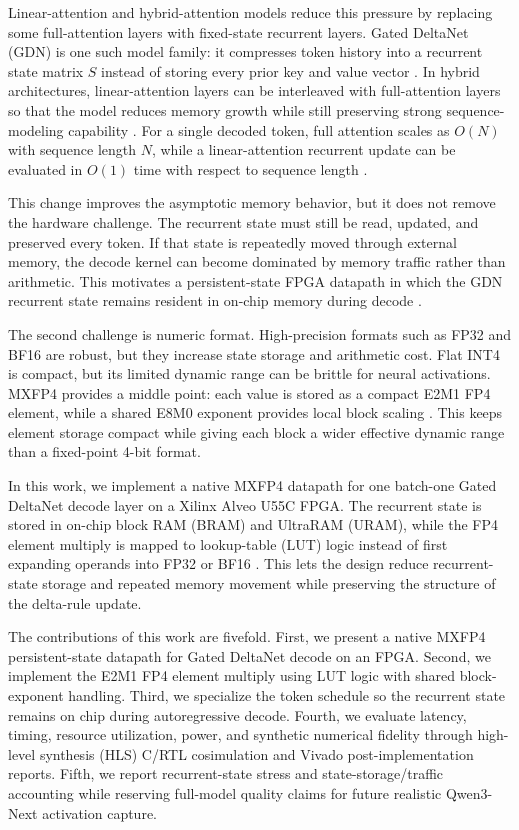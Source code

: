 Linear-attention and hybrid-attention models reduce this pressure by replacing
some full-attention layers with fixed-state recurrent layers. Gated DeltaNet
(GDN) is one such model family: it compresses token history into a recurrent
state matrix $S$ instead of storing every prior key and value vector
\cite{b8,b3}. In hybrid architectures, linear-attention layers can be interleaved
with full-attention layers so that the model reduces memory growth while still
preserving strong sequence-modeling capability \cite{b9}. For a single decoded
token, full attention scales as $O(N)$ with sequence length $N$, while a
linear-attention recurrent update can be evaluated in $O(1)$ time with respect
to sequence length \cite{b8}.

This change improves the asymptotic memory behavior, but it does not remove the
hardware challenge. The recurrent state must still be read, updated, and
preserved every token. If that state is repeatedly moved through external memory,
the decode kernel can become dominated by memory traffic rather than arithmetic.
This motivates a persistent-state FPGA datapath in which the GDN recurrent state
remains resident in on-chip memory during decode \cite{b10,b4}.

The second challenge is numeric format. High-precision formats such as FP32 and
BF16 are robust, but they increase state storage and arithmetic cost. Flat INT4
is compact, but its limited dynamic range can be brittle for neural activations.
MXFP4 provides a middle point: each value is stored as a compact E2M1 FP4
element, while a shared E8M0 exponent provides local block scaling
\cite{b11}. This keeps element storage compact while giving each block a wider
effective dynamic range than a fixed-point 4-bit format.

In this work, we implement a native MXFP4 datapath for one batch-one Gated
DeltaNet decode layer on a Xilinx Alveo U55C FPGA. The recurrent state is stored
in on-chip block RAM (BRAM) and UltraRAM (URAM), while the FP4 element multiply
is mapped to lookup-table (LUT) logic instead of first expanding operands into
FP32 or BF16 \cite{b12}. This lets the design reduce recurrent-state storage and repeated
memory movement while preserving the structure of the delta-rule update.

The contributions of this work are fivefold. First, we present a native MXFP4
persistent-state datapath for Gated DeltaNet decode on an FPGA. Second, we
implement the E2M1 FP4 element multiply using LUT logic with shared
block-exponent handling. Third, we specialize the token schedule so the
recurrent state remains on chip during autoregressive decode. Fourth, we
evaluate latency, timing, resource utilization, power, and synthetic numerical
fidelity through high-level synthesis (HLS) C/RTL cosimulation and Vivado
post-implementation reports. Fifth, we report recurrent-state stress and
state-storage/traffic accounting while reserving full-model quality claims for
future realistic Qwen3-Next activation capture.

